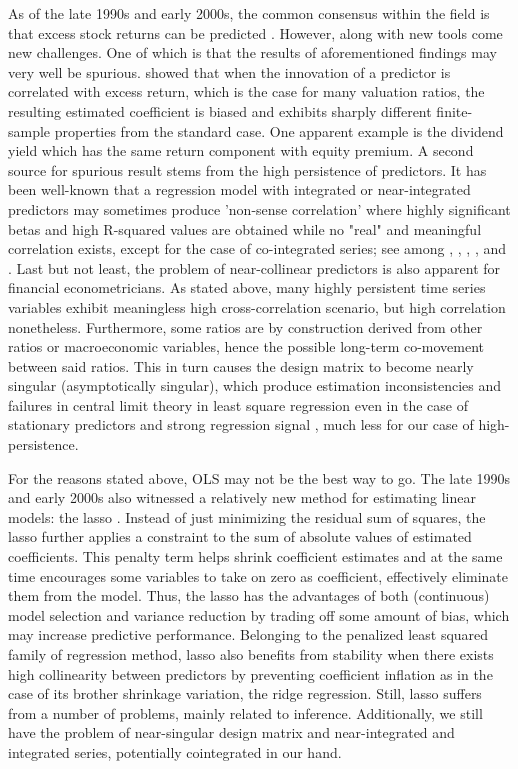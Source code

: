 \documentclass[12pt,a4paper]{article}
\begin{document}
As of the late 1990s and early 2000s, the common consensus within the field is that excess stock returns can be predicted \citep{welch2008comprehensive}. However, along with new tools come new challenges. One of which is that the results of aforementioned findings may very well be spurious. \citep{stambaugh1999predictive} showed that when the innovation of a predictor is correlated with excess return, which is the case for many valuation ratios, the resulting estimated coefficient is biased and exhibits sharply different finite-sample properties from the standard case. One apparent example is the dividend yield which has the same return component with equity premium. A second source for spurious result stems from the high persistence of predictors. It has been well-known that a regression model with integrated or near-integrated predictors may sometimes produce 'non-sense correlation' where highly significant betas and high R-squared values are obtained while no "real" and meaningful correlation exists, except for the case of co-integrated series; see among \cite{yule1926we}, \cite{granger1974spurious}, \cite{phillips1986understanding}, \cite{granger2001spurious}, and \cite{engle1987co}. Last but not least, the problem of near-collinear predictors is also apparent for financial econometricians. As stated above, many highly persistent time series variables exhibit meaningless high cross-correlation scenario, but high correlation nonetheless. Furthermore, some ratios are by construction derived from other ratios or macroeconomic variables, hence the possible long-term co-movement between said ratios. This in turn causes the design matrix to become nearly singular (asymptotically singular), which produce estimation inconsistencies and failures in central limit theory in least square regression even in the case of stationary predictors and strong regression signal \citep{phillips2016inference}, much less for our case of high-persistence.

For the reasons stated above, OLS may not be the best way to go. The late 1990s and early 2000s also witnessed a relatively new method for estimating linear models: the lasso \citep{tibshirani1996regression}. Instead of just minimizing the residual sum of squares, the lasso further applies a constraint to the sum of absolute values of estimated coefficients. This penalty term helps shrink coefficient estimates and at the same time encourages some variables to take on zero as coefficient, effectively eliminate them from the model. Thus, the lasso has the advantages of both (continuous) model selection and variance reduction by trading off some amount of bias, which may increase predictive performance. Belonging to the penalized least squared family of regression method, lasso also benefits from stability when there exists high collinearity between predictors by preventing coefficient inflation as in the case of its brother shrinkage variation, the ridge regression. Still, lasso suffers from a number of problems, mainly related to inference. Additionally, we still have the problem of near-singular design matrix and near-integrated and integrated series, potentially cointegrated in our hand.
\end{document}
